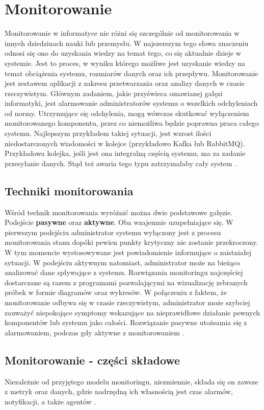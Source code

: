 \section{Monitorowanie}
    Monitorowanie w informatyce nie różni się szczególnie od monitorowania w innych dziedzinach nauki lub przemysłu. 
    W najszerszym tego słowa znaczeniu odnosi się ono do uzyskania wiedzy na temat tego, co się aktualnie dzieje w systemie.
    Jest to proces, w wyniku którego możliwe jest uzyskanie wiedzy na temat obciążenia systemu, rozmiarów danych oraz ich przepływu. Monitorowanie jest zestawem aplikacji z zakresu przetwarzania oraz analizy danych w czasie rzeczywistym. 
    Głównym zadaniem, jakie przyświeca omawianej gałęzi informatyki, jest alarmowanie administratorów systemu o wszelkich
    odchyleniach od normy. Utrzymujące się odchylenia, mogą wówczas skutkować wyłączeniem monitorowanego
    komponentu, przez co niemożliwa będzie poprawna praca całego systemu. Najlepszym przykładem takiej sytuacji, 
    jest wzrost ilości niedostarczonych wiadomości w kolejce (przykładowo Kafka lub RabbitMQ). Przykładowa kolejka, jeśli jest ona integralną częścią systemu, ma za zadanie przesyłanie danych. Stąd też awaria tego typu zatrzymałaby cały system \cite{monitoring_and_alerting}.
    
\subsection{Techniki monitorowania}
    Wśród technik monitorowania wyróżnić można dwie podstawowe gałęzie. Podejście \textbf{pasywne} oraz \textbf{aktywne}. Oba wzajemnie uzupełniające się.
    W pierwszym podejściu administrator systemu wyłączony jest z procesu monitorowania stanu dopóki pewien
    punkty krytyczny nie zostanie przekroczony. W tym momencie wystosowywane jest powiadomienie informujące o zaistniałej
    sytuacji. W podejściu aktywnym natomiast, administrator może na bieżąco analizować dane spływające z systemu.
    Rozwiązania monitoringu najczęściej dostarczane są razem z programami pozwalającymi na
    wizualizację zebranych próbek w formie diagramów oraz wykresów. W połączeniu z faktem, że monitorowanie odbywa się
    w czasie rzeczywistym, administrator może szybciej zauważyć niepokojące symptomy wskazujące
    na nieprawidłowe działanie pewnych komponentów lub systemu jako całości.
    Rozwiązanie pasywne utożsamia się z alarmowaniem, podczas gdy aktywne z monitorowaniem \cite{monitoring_and_alerting}.
    
    \subsection{Monitorowanie - części składowe}
    Niezależnie od przyjętego modelu monitoringu, niezmiennie, składa się on zawsze z metryk oraz danych, gdzie nadrzędną 
    ich własnością jest czas alarmów, notyfikacji, a także agentów \cite{monitoring_and_alerting}.
    
